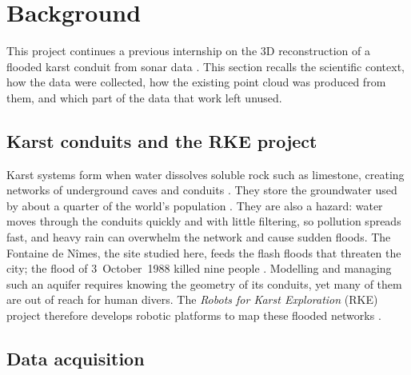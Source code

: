 \section{Background}                     %
\label{sec:background}                   %

This project continues a previous internship on the 3D reconstruction of a flooded karst conduit
from sonar data \citep{margaritis2025internship}. This section recalls the scientific context,
how the data were collected, how the existing point cloud was produced from them, and which part
of the data that work left unused.

\subsection{Karst conduits and the RKE project}   %
\label{sec:bg_context}                            %

Karst systems form when water dissolves soluble rock such as limestone, creating networks of
underground caves and conduits \citep{ford2007karst}. They store the groundwater used by about a
quarter of the world's population \citep{goldscheider2020karst}. They are also a hazard: water
moves through the conduits quickly and with little filtering, so pollution spreads fast, and
heavy rain can overwhelm the network and cause sudden floods. The Fontaine de N\^imes, the site
studied here, feeds the flash floods that threaten the city; the flood of 3~October~1988 killed
nine people \citep{marechal2008nimes, batiot2013nimes}. Modelling and managing such an aquifer
requires knowing the geometry of its conduits, yet many of them are out of reach for human divers.
The \emph{Robots for Karst Exploration} (RKE) project therefore develops robotic platforms to map
these flooded networks \citep{lapierre2021karst}.

\subsection{Data acquisition}            %
\label{sec:bg_acquisition}               %

